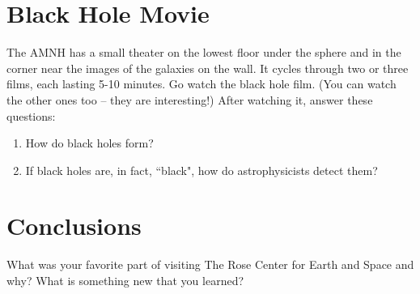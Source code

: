 \documentclass[12pt]{article}
\begin{document}
\section{Black Hole Movie}

The AMNH has a small theater on the lowest floor under the sphere and in the corner near the images of the galaxies on the wall.  It cycles through two or three films, each lasting 5-10 minutes.  Go watch the black hole film. (You can watch the other ones too -- they are interesting!)  After watching it, answer these questions:

\begin{enumerate}


\item How do black holes form?
\vspace{0.7in}

\item If black holes are, in fact, ``black", how do astrophysicists detect them?
\vspace{1in}
\end{enumerate}


\section{Conclusions}

What was your favorite part of visiting The Rose Center for Earth and Space and why? What is something new that you learned?
\end{document}
